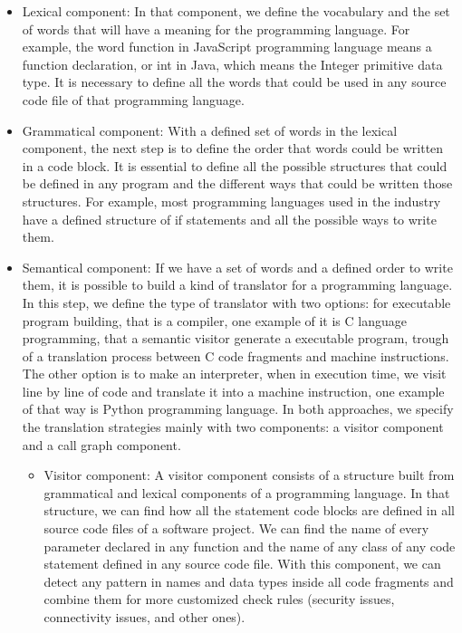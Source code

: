 \begin{itemize}
	\item Lexical component: In that component, we define the vocabulary and the set of words that will have a meaning for the programming language. For example, the word function in JavaScript programming language means a function declaration, or int in Java, which means the Integer primitive data type. It is necessary to define all the words that could be used in any source code file of that programming language.
	\item Grammatical component: With a defined set of words in the lexical component, the next step is to define the order that words could be written in a code block. It is essential to define all the possible structures that could be defined in any program and the different ways that could be written those structures. For example, most programming languages used in the industry have a defined structure of if statements and all the possible ways to write them.
	\item Semantical component: If we have a set of words and a defined order to write them, it is possible to build a kind of translator for a programming language. In this step, we define the type of translator with two options: for executable program building, that is a compiler, one example of it is C language programming, that a semantic visitor generate a executable program, trough of a translation process between C code fragments and machine instructions. The other option is to make an interpreter, when in execution time, we visit line by line of code and translate it into a machine instruction, one example of that way is Python programming language. In both approaches, we specify the translation strategies mainly with two components: a visitor component and a call graph component.
		\begin{itemize}
			\item Visitor component: A visitor component consists of a structure built from grammatical and lexical components of a programming language. In that structure, we can find how all the statement code blocks are defined in all source code files of a software project. We can find the name of every parameter declared in any function and the name of any class of any code statement defined in any source code file. With this component, we can detect any pattern in names and data types inside all code fragments and combine them for more customized check rules (security issues, connectivity issues, and other ones).		
			\begin{figure}

\end{figure}
\end{itemize}
\end{itemize}
